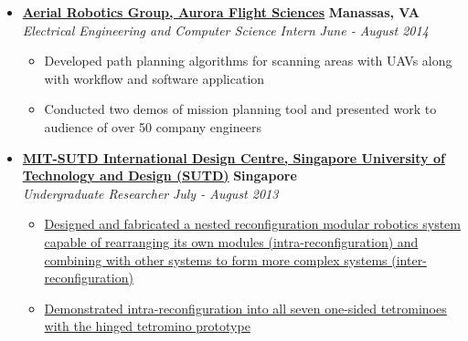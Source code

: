 \documentclass[10pt,letterpaper]{article}
\begin{document}
\begin{itemize}
\begin{itemize}[label=\textbullet]
\end{itemize}

    \item[]
    {\href{http://aurora.aero}{\textbf{Aerial Robotics Group, Aurora Flight Sciences}} \hfill
      \textbf{Manassas, VA}}
    \\
    {\emph{Electrical Engineering and Computer Science Intern} \hfill \emph{June - August 2014}}
	
	\begin{itemize}[label=\textbullet]
	\itemsep0em
	\item Developed path planning algorithms for scanning areas with UAVs along with workflow and software application
	\item Conducted two demos of mission planning tool and presented work to audience of over 50 company engineers

\end{itemize}

    \item[]
    {\href{http://www.sutd.edu.sg/idc.aspx}{\textbf{MIT-SUTD International Design Centre, Singapore University of Technology and Design (SUTD)}} \hfill
      \textbf{Singapore}}
    \\
    {\emph{Undergraduate Researcher} \hfill \emph{July - August 2013}}
	
	\begin{itemize}[label=\textbullet]
	\itemsep0em
	\item {\href{http://vincentkee.wordpress.com/tetromino/}{Designed and fabricated a nested reconfiguration modular robotics system capable of rearranging its own modules (intra-reconfiguration) and combining with other systems to form more complex systems (inter-reconfiguration)}}
	\item {\href{http://www.youtube.com/watch?v=YFhAlsQ3uYQ}{Demonstrated intra-reconfiguration into all seven one-sided tetrominoes with the hinged tetromino prototype}}

\end{itemize}


%	
\end{itemize}
\end{document}
